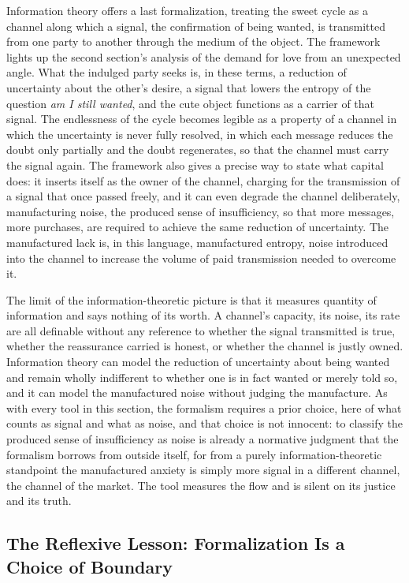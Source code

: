 \documentclass[11pt,a4paper]{article}
\begin{document}
Information theory offers a last formalization, treating the sweet cycle as a channel along which a signal, the confirmation of being wanted, is transmitted from one party to another through the medium of the object. The framework lights up the second section's analysis of the demand for love from an unexpected angle. What the indulged party seeks is, in these terms, a reduction of uncertainty about the other's desire, a signal that lowers the entropy of the question \textit{am I still wanted}, and the cute object functions as a carrier of that signal. The endlessness of the cycle becomes legible as a property of a channel in which the uncertainty is never fully resolved, in which each message reduces the doubt only partially and the doubt regenerates, so that the channel must carry the signal again. The framework also gives a precise way to state what capital does: it inserts itself as the owner of the channel, charging for the transmission of a signal that once passed freely, and it can even degrade the channel deliberately, manufacturing noise, the produced sense of insufficiency, so that more messages, more purchases, are required to achieve the same reduction of uncertainty. The manufactured lack is, in this language, manufactured entropy, noise introduced into the channel to increase the volume of paid transmission needed to overcome it.

The limit of the information-theoretic picture is that it measures quantity of information and says nothing of its worth. A channel's capacity, its noise, its rate are all definable without any reference to whether the signal transmitted is true, whether the reassurance carried is honest, or whether the channel is justly owned. Information theory can model the reduction of uncertainty about being wanted and remain wholly indifferent to whether one is in fact wanted or merely told so, and it can model the manufactured noise without judging the manufacture. As with every tool in this section, the formalism requires a prior choice, here of what counts as signal and what as noise, and that choice is not innocent: to classify the produced sense of insufficiency as noise is already a normative judgment that the formalism borrows from outside itself, for from a purely information-theoretic standpoint the manufactured anxiety is simply more signal in a different channel, the channel of the market. The tool measures the flow and is silent on its justice and its truth.

\subsection{The Reflexive Lesson: Formalization Is a Choice of Boundary}
\end{document}
